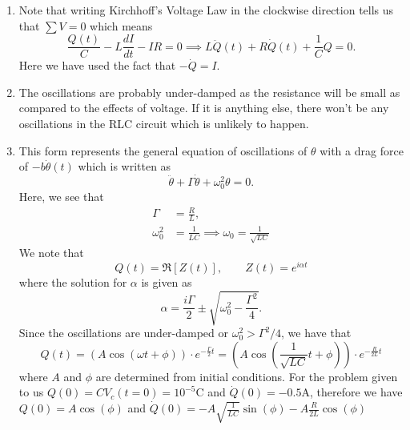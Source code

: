 \begin{sol}
\begin{enumerate}[label=\textbf{(\alph*)}]
\item Note that writing Kirchhoff's Voltage Law in the clockwise direction tells us that $\sum V = 0$ which means 
\[\frac{Q(t)}{C} - L\frac{dI}{dt} - IR = 0\implies \boxed{L\ddot{Q}(t) + R\dot{Q}(t) + \frac{1}{C}Q = 0}.\]
Here we have used the fact that $-\dot{Q} = I$.
\item The oscillations are probably under-damped as the resistance will be small as compared to the effects of voltage. If it is anything else, there won't be any oscillations in the RLC circuit which is unlikely to happen.
\item This form represents the general equation of oscillations of $\theta$ with a drag force of $-b\dot{\theta}(t)$ which is written as 
\[\ddot\theta + \Gamma \dot\theta + \omega_0^2 \theta = 0.\]
Here, we see that 
\begin{align*}
    \Gamma &= \frac{R}{L},\\
    \omega_0^2 &= \frac{1}{LC}\implies \omega_0 = \frac{1}{\sqrt{LC}}
\end{align*}
We note that 
\[Q (t) = \Re [Z (t)], \qquad Z(t) = e^{i\alpha t}\]
where the solution for $\alpha$ is given as 
\[\alpha = \frac{i\Gamma}{2}\pm \sqrt{\omega_0^2 - \frac{\Gamma^2}{4}}.\]
Since the oscillations are under-damped or $\omega_0^2 > \Gamma^2/4$, we have that 
\[Q(t) = (A\cos (\omega t + \phi)) \cdot e^{-\frac{\Gamma}{2}t} = \boxed{\left(A\cos (\frac{1}{\sqrt{LC}} t + \phi)\right) \cdot e^{-\frac{R}{2L}t}}\]
where $A$ and $\phi$ are determined from initial conditions.
For the problem given to us $Q(0) = CV_c(t=0) = 10^{-5} \text{C} $ and $\dot {Q} (0) = -0.5 \text{A}$, therefore we have $Q(0) = A \cos (\phi)$ and $\dot {Q}(0) = - A \sqrt {\frac{1}{LC}} \sin (\phi) - A \frac{R}{2L} \cos (\phi)$
\end{enumerate}
\end{sol}